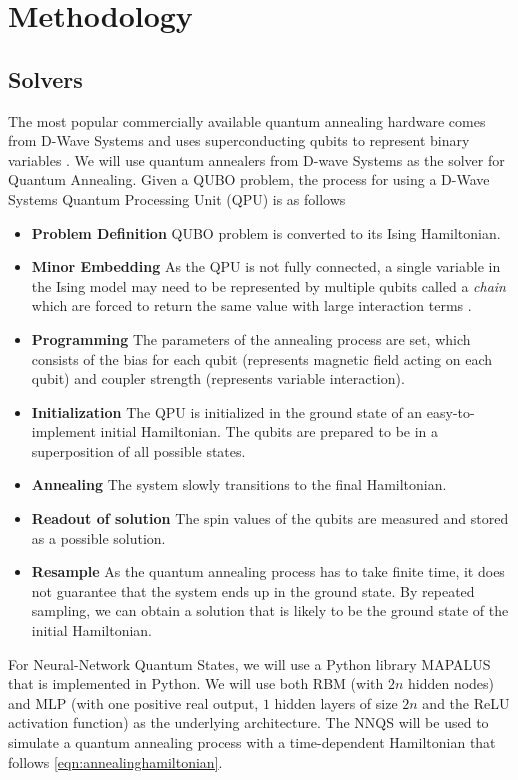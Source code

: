 
\chapter{Methodology}
\label{methodology}

\section{Solvers}
The most popular commercially available quantum annealing hardware comes from D-Wave Systems and uses superconducting qubits to represent binary variables \cite{b14}. We will use quantum annealers from D-wave Systems as the solver for Quantum Annealing. Given a QUBO problem, the process for using a D-Wave Systems Quantum Processing Unit (QPU) is as follows

\begin{itemize}
    \item \textbf{Problem Definition} QUBO problem is converted to its Ising Hamiltonian.
    \item \textbf{Minor Embedding} As the QPU is not fully connected, a single variable in the Ising model may need to be represented by multiple qubits called a \textit{chain} which are forced to return the same value with large interaction terms \cite{b16}.
    \item \textbf{Programming} The parameters of the annealing process are set, which consists of the bias for each qubit (represents magnetic field acting on each qubit) and coupler strength (represents variable interaction).
    \item \textbf{Initialization} The QPU is initialized in the ground state of an easy-to-implement initial Hamiltonian. The qubits are prepared to be in a superposition of all possible states.
    \item \textbf{Annealing} The system slowly transitions to the final Hamiltonian.
    \item \textbf{Readout of solution} The spin values of the qubits are measured and stored as a possible solution.
    \item \textbf{Resample} As the quantum annealing process has to take finite time, it does not guarantee that the system ends up in the ground state. By repeated sampling, we can obtain a solution that is likely to be the ground state of the initial Hamiltonian.
\end{itemize}

For Neural-Network Quantum States, we will use a Python library MAPALUS that is implemented in Python. We will use both RBM (with $2n$ hidden nodes) and MLP (with one positive real output, $1$ hidden layers of size $2n$ and the ReLU activation function) as the underlying architecture. The NNQS will be used to simulate a quantum annealing process with a time-dependent Hamiltonian that follows \autoref{eqn:annealinghamiltonian}. 

